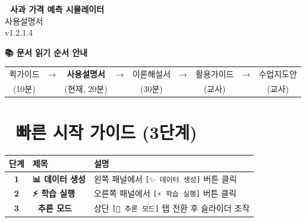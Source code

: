 \documentclass[11pt,a4paper]{article}
\begin{document}
\begin{center}
    {\Huge\bfseries\color{primaryblue} 🍎 사과 가격 예측 시뮬레이터}\\[8pt]
    {\Large 사용설명서}\\[6pt]
    {\large\color{textmedium} v1.2.1.4}\\[20pt]
\end{center}

\begin{guidebox}
\begin{center}
{\large\bfseries\color{primarygreen} 📚 문서 읽기 순서 안내}
\end{center}

\begin{center}
\begin{tabular}{ccccccccc}
퀵가이드 & → & \colorbox{accentyellow}{\textbf{사용설명서}} & → & 이론해설서 & → & 활용가이드 & → & 수업지도안 \\
(10분) & & (현재, 20분) & & (30분) & & (교사) & & (교사)
\end{tabular}
\end{center}
\end{guidebox}

\vspace{15pt}

\section*{🚀 빠른 시작 가이드 (3단계)}

\begin{center}
\begin{tabular}{|c|l|p{7cm}|}
\hline
\rowcolor{bggreen}
\textbf{단계} & \textbf{제목} & \textbf{설명} \\
\hline
\textbf{1} & \textcolor{primarygreen}{\textbf{📊 데이터 생성}} & 왼쪽 패널에서 \texttt{[✨ 데이터 생성]} 버튼 클릭 \\
\hline
\textbf{2} & \textcolor{primaryblue}{\textbf{⚡ 학습 실행}} & 오른쪽 패널에서 \texttt{[⚡ 학습 실행]} 버튼 클릭 \\
\hline
\textbf{3} & \textcolor{primaryblue}{\textbf{🔮 추론 모드}} & 상단 \texttt{[🔮 추론 모드]} 탭 전환 후 슬라이더 조작 \\
\hline
\end{tabular}
\end{center}

\vspace{10pt}

\end{document}
